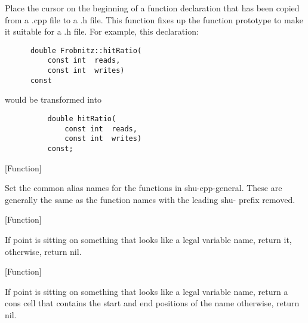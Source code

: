 \begin{doc-string}
Place the cursor on the beginning of a function declaration that has been
copied from a .cpp file to a .h file.  This function fixes up the function
prototype to make it suitable for a .h file.
For example, this declaration:

\small{\begin{verbatim}
      double Frobnitz::hitRatio(
          const int  reads,
          const int  writes)
      const
\end{verbatim}}

would be transformed into

\small{\begin{verbatim}
          double hitRatio(
              const int  reads,
              const int  writes)
          const;
\end{verbatim}}
\end{doc-string}

\vspace{1em}
\noindent
{}
\usebox{\funcname}
 \hfill [Function]

\begin{doc-string}
Set the common alias names for the functions in shu-cpp-general.
These are generally the same as the function names with the leading
shu- prefix removed.
\end{doc-string}

\vspace{1em}
\noindent
{}
\usebox{\funcname}
 \hfill [Function]

\begin{doc-string}
If point is sitting on something that looks like a legal variable name, return it,
otherwise, return nil.
\end{doc-string}

\vspace{1em}
\noindent
{}
\usebox{\funcname}
 \hfill [Function]

\begin{doc-string}
If point is sitting on something that looks like a legal variable name,
return a cons cell that contains the start and end positions of the name
otherwise, return nil.
\end{doc-string}

